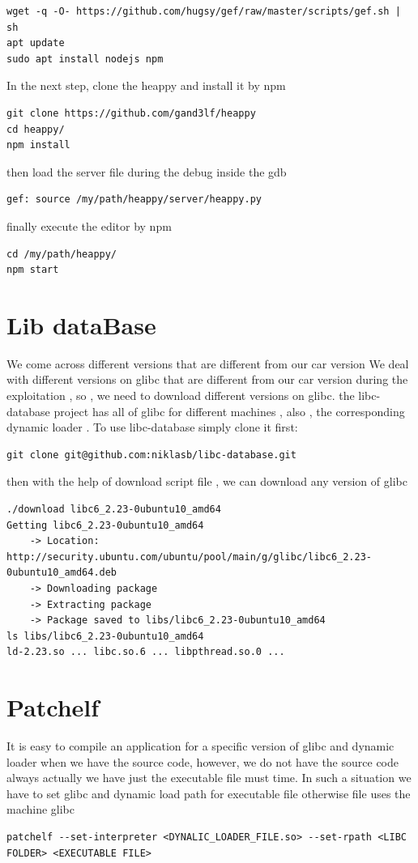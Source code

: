 \documentclass{masterthesis}
\newcommand*\libc{glibc}
\begin{document}
\begin{lstlisting}[frame=tlrb]
wget -q -O- https://github.com/hugsy/gef/raw/master/scripts/gef.sh | sh
apt update
sudo apt install nodejs npm
\end{lstlisting}

In the next step, clone the heappy and install it by npm

\begin{lstlisting}[frame=tlrb]
git clone https://github.com/gand3lf/heappy
cd heappy/
npm install
\end{lstlisting}

then load the server file during the debug inside the gdb
\begin{lstlisting}[frame=tlrb]
gef: source /my/path/heappy/server/heappy.py
\end{lstlisting}

finally execute the editor by npm

\begin{lstlisting}[frame=tlrb]
cd /my/path/heappy/
npm start
\end{lstlisting}


\section{Lib dataBase}
We come across different versions that are different from our car version
We deal with different versions on \libc{} that are different from our car version during the exploitation  , so , we need to download different versions on \libc{}. the libc-database project has all of \libc{} for different machines , also , the corresponding dynamic loader . To use libc-database simply clone it first:
\begin{lstlisting}[frame=tlrb]
git clone git@github.com:niklasb/libc-database.git
\end{lstlisting}
then with the help of download script file , we can download any version of \libc{}
\begin{lstlisting}[frame=tlrb]
./download libc6_2.23-0ubuntu10_amd64
Getting libc6_2.23-0ubuntu10_amd64
    -> Location: http://security.ubuntu.com/ubuntu/pool/main/g/glibc/libc6_2.23-0ubuntu10_amd64.deb
    -> Downloading package
    -> Extracting package
    -> Package saved to libs/libc6_2.23-0ubuntu10_amd64
ls libs/libc6_2.23-0ubuntu10_amd64
ld-2.23.so ... libc.so.6 ... libpthread.so.0 ...
\end{lstlisting}

\section{Patchelf}
It is easy to compile an application for a specific version of \libc{} and dynamic loader when we have the source code, however, we do not have the source code always actually we have just the executable file must time. In such a situation we have to set \libc{} and dynamic load path for executable file otherwise file uses the machine \libc{}
\begin{lstlisting}[frame=tlrb]
patchelf --set-interpreter <DYNALIC_LOADER_FILE.so> --set-rpath <LIBC FOLDER> <EXECUTABLE FILE>  
\end{lstlisting}
\end{document}
